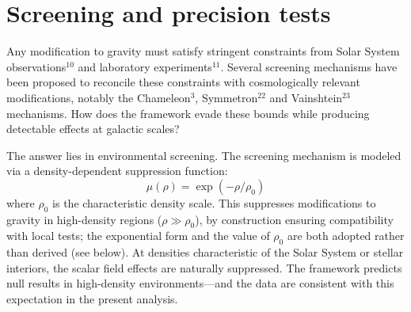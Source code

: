 \documentclass[11pt,a4paper]{article}
\begin{document}

\section*{Screening and precision tests}

Any modification to gravity must satisfy stringent constraints from Solar System observations$^{10}$ and laboratory experiments$^{11}$. Several screening mechanisms have been proposed to reconcile these constraints with cosmologically relevant modifications, notably the Chameleon$^{3}$, Symmetron$^{22}$ and Vainshtein$^{23}$ mechanisms. How does the framework evade these bounds while producing detectable effects at galactic scales?

The answer lies in environmental screening. The screening mechanism is modeled via a density-dependent suppression function:
\begin{equation}
\mu(\rho) = \exp(-\rho/\rho_0)
\end{equation}
where $\rho_0$ is the characteristic density scale. This suppresses modifications to gravity in high-density regions ($\rho \gg \rho_0$), by construction ensuring compatibility with local tests; the exponential form and the value of $\rho_0$ are both adopted rather than derived (see below). At densities characteristic of the Solar System or stellar interiors, the scalar field effects are naturally suppressed. The framework predicts null results in high-density environments---and the data are consistent with this expectation in the present analysis.
\end{document}

